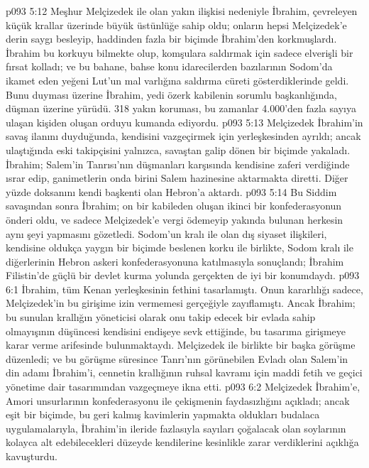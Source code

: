 \vs p093 5:12 Meşhur Melçizedek ile olan yakın ilişkisi nedeniyle İbrahim, çevreleyen küçük krallar üzerinde büyük üstünlüğe sahip oldu; onların hepsi Melçizedek’e derin saygı besleyip, haddinden fazla bir biçimde İbrahim’den korkmuşlardı. İbrahim bu korkuyu bilmekte olup, komşulara saldırmak için sadece elverişli bir fırsat kolladı; ve bu bahane, bahse konu idarecilerden bazılarının Sodom’da ikamet eden yeğeni Lut’un mal varlığına saldırma cüreti gösterdiklerinde geldi. Bunu duyması üzerine İbrahim, yedi özerk kabilenin sorumlu başkanlığında, düşman üzerine yürüdü. 318 yakın koruması, bu zamanlar 4.000’den fazla sayıya ulaşan kişiden oluşan orduyu kumanda ediyordu.
\vs p093 5:13 Melçizedek İbrahim’in savaş ilanını duyduğunda, kendisini vazgeçirmek için yerleşkesinden ayrıldı; ancak ulaştığında eski takipçisini yalnızca, savaştan galip dönen bir biçimde yakaladı. İbrahim; Salem’in Tanrısı’nın düşmanları karşısında kendisine zaferi verdiğinde ısrar edip, ganimetlerin onda birini Salem hazinesine aktarmakta diretti. Diğer yüzde doksanını kendi başkenti olan Hebron’a aktardı.
\vs p093 5:14 Bu Siddim savaşından sonra İbrahim; on bir kabileden oluşan ikinci bir konfederasyonun önderi oldu, ve sadece Melçizedek’e vergi ödemeyip yakında bulunan herkesin aynı şeyi yapmasını gözetledi. Sodom’un kralı ile olan dış siyaset ilişkileri, kendisine oldukça yaygın bir biçimde beslenen korku ile birlikte, Sodom kralı ile diğerlerinin Hebron askeri konfederasyonuna katılmasıyla sonuçlandı; İbrahim Filistin’de güçlü bir devlet kurma yolunda gerçekten de iyi bir konumdaydı.
\vs p093 6:1 İbrahim, tüm Kenan yerleşkesinin fethini tasarlamıştı. Onun kararlılığı sadece, Melçizedek’in bu girişime izin vermemesi gerçeğiyle zayıflamıştı. Ancak İbrahim; bu sunulan krallığın yöneticisi olarak onu takip edecek bir evlada sahip olmayışının düşüncesi kendisini endişeye sevk ettiğinde, bu tasarıma girişmeye karar verme arifesinde bulunmaktaydı. Melçizedek ile birlikte bir başka görüşme düzenledi; ve bu görüşme süresince Tanrı’nın görünebilen Evladı olan Salem’in din adamı İbrahim’i, cennetin krallığının ruhsal kavramı için maddi fetih ve geçici yönetime dair tasarımından vazgeçmeye ikna etti.
\vs p093 6:2 Melçizedek İbrahim’e, Amori unsurlarının konfederasyonu ile çekişmenin faydasızlığını açıkladı; ancak eşit bir biçimde, bu geri kalmış kavimlerin yapmakta oldukları budalaca uygulamalarıyla, İbrahim’in ileride fazlasıyla sayıları çoğalacak olan soylarının kolayca alt edebilecekleri düzeyde kendilerine kesinlikle zarar verdiklerini açıklığa kavuşturdu.
